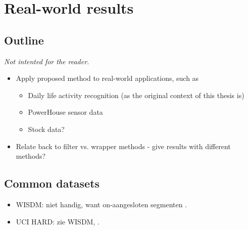 
\chapter{Real-world results}

\label{Chapter6} %


\section{Outline}
\emph{Not intented for the reader.}
\begin{itemize}
  \item Apply proposed method to real-world applications, such as
    \begin{itemize}
      \item Daily life activity recognition (as the original context of this thesis is)
      \item PowerHouse sensor data
      \item Stock data?
    \end{itemize}
  \item Relate back to filter vs. wrapper methods - give results with different methods?
\end{itemize}

\section{Common datasets}
\begin{itemize}
  \item WISDM: niet handig, want on-aangesloten segmenten \cite{kwapisz2011activity}.
  \item UCI HARD: zie WISDM, \cite{anguita2012human}.
\end{itemize}

